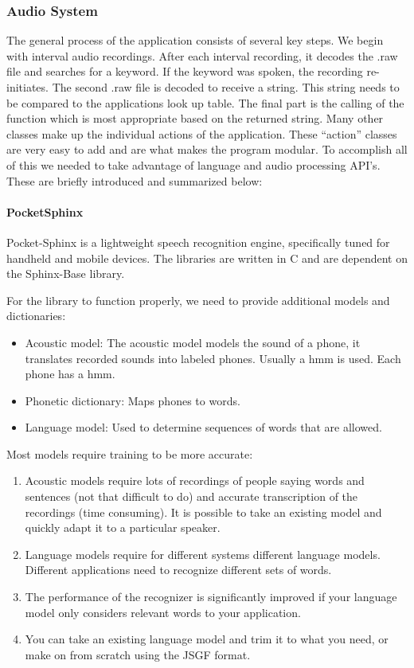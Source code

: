 \documentclass{article}
\begin{document}
\subsubsection{Audio System}
The general process of the application consists of several key steps. We begin with interval audio recordings. After each interval recording, it decodes the .raw file and searches for a keyword. If the keyword was spoken, the recording re-initiates. The second .raw file is decoded to receive a string. This string needs to be compared to the applications look up table. The final part is the calling of the function which is most appropriate based on the returned string. 
Many other classes make up the individual actions of the application. These “action” classes are very easy to add and are what makes the program modular. 
To accomplish all of this we needed to take advantage of language and audio processing API’s. These are briefly introduced and summarized below:

\paragraph{PocketSphinx}
Pocket-Sphinx is a lightweight speech recognition engine, specifically tuned for handheld and mobile devices. The libraries are written in C and are dependent on the Sphinx-Base library. \vspace{12pt}

\noindent For the library to function properly, we need to provide additional models and dictionaries:
\begin{itemize}
	\item Acoustic model: The acoustic model models the sound of a phone, it translates recorded sounds into labeled phones. Usually a hmm is used. Each phone has a hmm. 
	\item Phonetic dictionary: Maps phones to words.
	\item Language model: Used to determine sequences of words that are allowed. 
\end{itemize}
	

\noindent Most models require training to be more accurate:
\begin{enumerate}
	\item Acoustic models require lots of recordings of people saying words and sentences (not that difficult to do) and accurate transcription of the recordings (time consuming). It is possible to take an existing model and quickly adapt it to a particular speaker.
	\item Language models require for different systems different language models. Different applications need to recognize different sets of words.
	\item The performance of the recognizer is significantly improved if your language model only considers relevant words to your application.
	\item You can take an existing language model and trim it to what you need, or make on from scratch using the JSGF format.
\end{enumerate}
	
\end{document}
